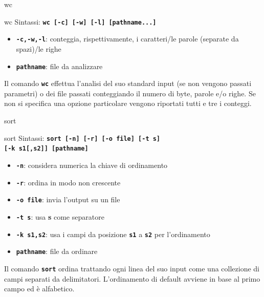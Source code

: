 \documentclass{beamer}
\begin{document}
    \begin{frame}{wc}
        \begin{block}{wc}
            \small
            Sintassi: \texttt{\textbf{wc [-c] [-w] [-l] [pathname...]}}

            \begin{itemize}
                \item \texttt{\textbf{-c,-w,-l}}: conteggia, rispettivamente, i caratteri/le parole (separate da spazi)/le righe
                \item \texttt{\textbf{pathname}}: file da analizzare
            \end{itemize}

            Il comando \texttt{\textbf{wc}} effettua l’analisi del suo standard input (se non vengono
            passati parametri) o dei file passati conteggiando il numero di byte, parole
            e/o righe. Se non si specifica una opzione particolare vengono riportati
            tutti e tre i conteggi.
        \end{block}
    \end{frame}

    \begin{frame}{sort}
        \begin{block}{sort}
            \small
            Sintassi: \texttt{\textbf{sort [-n] [-r] [-o file] [-t s]}} \\
            \texttt{\textbf{[-k s1[,s2]] [pathname]}}

            \begin{itemize}
                \item \texttt{\textbf{-n}}: considera numerica la chiave di ordinamento
                \item \texttt{\textbf{-r}}: ordina in modo non crescente
                \item \texttt{\textbf{-o file}}: invia l'output su un file
                \item \texttt{\textbf{-t s}}: usa \textbf{s} come separatore
                \item \texttt{\textbf{-k s1,s2}}: usa i campi da posizione \texttt{\textbf{s1}} a \texttt{\textbf{s2}} per l'ordinamento
                \item \texttt{\textbf{pathname}}: file da ordinare
            \end{itemize}

            Il comando \texttt{\textbf{sort}} ordina trattando ogni linea del suo input come una
            collezione di campi separati da delimitatori.
            L’ordinamento di default avviene in base al primo campo ed è alfabetico.
        \end{block}
    \end{frame}
\end{document}

